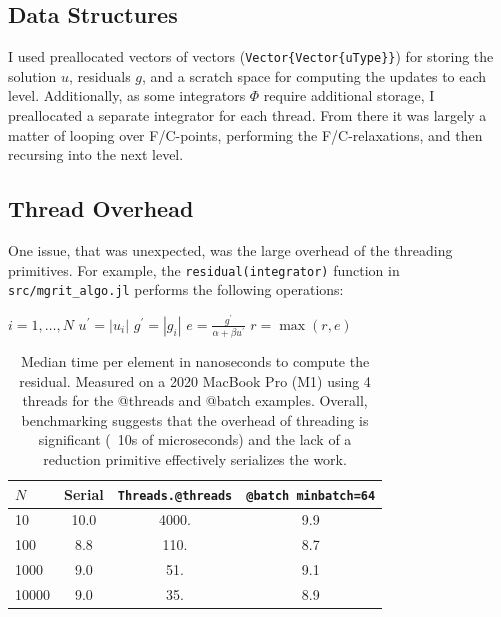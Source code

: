 \documentclass{article}
\begin{document}
\subsection{Data Structures}
I used preallocated vectors of vectors (\verb!Vector{Vector{uType}}!) for storing the solution \(u\), residuals \(g\), and a scratch space for computing the updates to each level.
Additionally, as some integrators \(\Phi\) require additional storage, I preallocated a separate integrator for each thread.
From there it was largely a matter of looping over F/C-points, performing the F/C-relaxations, and then recursing into the next level.

\subsection{Thread Overhead}
One issue, that was unexpected, was the large overhead of the threading primitives.
For example, the \verb!residual(integrator)! function in \verb!src/mgrit_algo.jl! performs the following operations:

\begin{algorithm}[h!]
    \begin{algorithmic}
        \For \(i = 1, \dots, N\)
            \State \( u^\prime = |u_i| \)   
            \State \( g^\prime = |g_i| \)        
            \State \( e = \frac{g^\prime}{\alpha + \beta u^\prime} \) 
            \State \( r = \max(r, e) \) 
        \EndFor
    \end{algorithmic}
\end{algorithm}

\begin{table}[h!]
    \centering
    \begin{tabular}[t]{lccc}
        \(N\)   & Serial & \verb!Threads.@threads! & \verb!@batch minbatch=64! \\
        \midrule
        10      & 10.0 & 4000. & 9.9 \\
        100     & 8.8  & 110.  & 8.7 \\
        1000    & 9.0  & 51.   & 9.1 \\
        10000   & 9.0  & 35.   & 8.9 \\
        \bottomrule
    \end{tabular}
    \caption{Median time per element in nanoseconds to compute the residual. Measured on a 2020 MacBook Pro (M1) using 4 threads for the @threads and @batch examples. Overall, benchmarking suggests that the overhead of threading is significant (~10s of microseconds) and the lack of a reduction primitive effectively serializes the work.}
    \label{tab:bench_residual}
\end{table}
\end{document}
